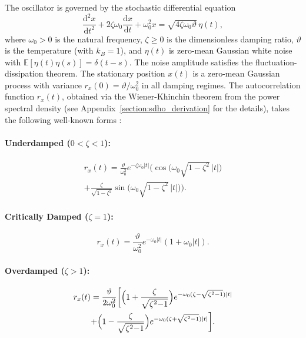 \documentclass[journal]{IEEEtran}
\theoremstyle{plain}
\theoremstyle{definition}
\theoremstyle{remark}
\newcommand{\E}{\mathbb{E}}
\newcommand{\dd}{\mathrm{d}}
\newcommand{\temp}{\vartheta}
\begin{document}
The oscillator is governed by the stochastic differential equation
\begin{equation}
    \frac{\dd^2 x}{\dd t^2} + 2 \zeta \omega_0 \frac{\dd x}{\dd t} + \omega_0^2 x = \sqrt{4 \zeta \omega_0 \temp} \, \eta(t), \label{eq:sdho_sde}
\end{equation}
where $\omega_0 > 0$ is the natural frequency, $\zeta \ge 0$ is the dimensionless damping ratio, $\temp$ is the temperature (with $k_B = 1$), and $\eta(t)$ is zero-mean Gaussian white noise with $\E[\eta(t)\eta(s)]=\delta(t-s)$. The noise amplitude satisfies the fluctuation-dissipation theorem. The stationary position $x(t)$ is a zero-mean Gaussian process with variance $r_x(0)=\temp/\omega_0^2$ in all damping regimes. The autocorrelation function $r_x(t)$, obtained via the Wiener-Khinchin theorem from the power spectral density \cite{rawat2024element} (see Appendix~\ref{section:sdho_derivation} for the details), takes the following well-known forms \cite{doob1942brownian}:



\paragraph{Underdamped (\( 0 < \zeta < 1 \)):}
\begin{multline}
    r_x(t) = \frac{\temp}{\omega_0^2} e^{-\zeta \omega_0 |t|} \biggl( \cos\bigl(\omega_0 \sqrt{1{-}\zeta^2}\, |t|\bigr) \\
    + \frac{\zeta}{\sqrt{1{-}\zeta^2}} \sin\bigl(\omega_0 \sqrt{1{-}\zeta^2}\, |t|\bigr) \biggr).
\label{eq:acf_underdamped}
\end{multline}

\paragraph{Critically Damped (\( \zeta = 1 \)):}
\begin{equation}
    r_x(t) = \frac{\temp}{\omega_0^2} e^{-\omega_0 |t|} \left( 1 + \omega_0 |t| \right).
\label{eq:acf_critical}
\end{equation}

\paragraph{Overdamped (\( \zeta > 1 \)):}
\begin{multline}
    r_x(t) = \frac{\temp}{2 \omega_0^2} \biggl[ \Bigl(1 + \frac{\zeta}{\sqrt{\zeta^2{-}1}}\Bigr) e^{-\omega_0(\zeta - \sqrt{\zeta^2-1})|t|} \\
    + \Bigl(1 - \frac{\zeta}{\sqrt{\zeta^2{-}1}}\Bigr) e^{-\omega_0(\zeta + \sqrt{\zeta^2-1})|t|} \biggr].
\label{eq:acf_overdamped}
\end{multline}
\end{document}
